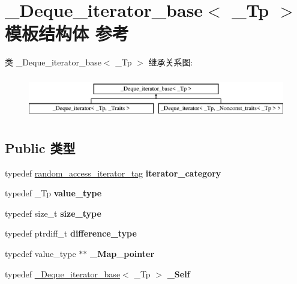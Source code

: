 \hypertarget{struct___deque__iterator__base}{}\section{\+\_\+\+Deque\+\_\+iterator\+\_\+base$<$ \+\_\+\+Tp $>$ 模板结构体 参考}
\label{struct___deque__iterator__base}
类 \+\_\+\+Deque\+\_\+iterator\+\_\+base$<$ \+\_\+\+Tp $>$ 继承关系图\+:\begin{figure}[H]
\begin{center}
\leavevmode
\includegraphics[height=1.848185cm]{struct___deque__iterator__base}
\end{center}
\end{figure}
\subsection*{Public 类型}
\begin{DoxyCompactItemize}
\item 
\mbox{\label{struct___deque__iterator__base_a6123e9f22931585e1d3298eb1fabd08b}} 
typedef \hyperlink{structrandom__access__iterator__tag}{random\+\_\+access\+\_\+iterator\+\_\+tag} {\bfseries iterator\+\_\+category}
\item 
\mbox{\label{struct___deque__iterator__base_a3dd8388422e2443b0cf6ab4087d4b146}} 
typedef \+\_\+\+Tp {\bfseries value\+\_\+type}
\item 
\mbox{\label{struct___deque__iterator__base_a270c31399a6374525fcb8fb5c065dd5d}} 
typedef size\+\_\+t {\bfseries size\+\_\+type}
\item 
\mbox{\label{struct___deque__iterator__base_ab1218a5e5c0124516187cb06631b2d18}} 
typedef ptrdiff\+\_\+t {\bfseries difference\+\_\+type}
\item 
\mbox{\label{struct___deque__iterator__base_a469be9c3b5639c5c90120918ad3d598d}} 
typedef value\+\_\+type $\ast$$\ast$ {\bfseries \+\_\+\+Map\+\_\+pointer}
\item 
\mbox{\label{struct___deque__iterator__base_a33c1154ebf20c7b5ca3ae3342abff71b}} 
typedef \hyperlink{struct___deque__iterator__base}{\+\_\+\+Deque\+\_\+iterator\+\_\+base}$<$ \+\_\+\+Tp $>$ {\bfseries \+\_\+\+Self}
\end{DoxyCompactItemize}
